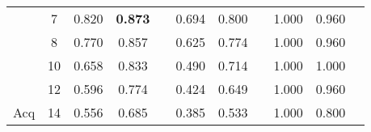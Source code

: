 \begin{table}[]
\begin{tabular}{|c|c|c|c|c|c|c|c|c|c|c|}
                       & 7                     & \cellcolor[HTML]{EFEFEF}0.820          & \cellcolor[HTML]{EFEFEF}\textbf{0.873} & \cellcolor[HTML]{EFEFEF}      & 0.694    & 0.800    &          & \cellcolor[HTML]{EFEFEF}1.000 & \cellcolor[HTML]{EFEFEF}0.960 & \cellcolor[HTML]{EFEFEF}      \\ \cline{2-11} 
                       & 8                     & \cellcolor[HTML]{EFEFEF}0.770          & \cellcolor[HTML]{EFEFEF}0.857          & \cellcolor[HTML]{EFEFEF}      & 0.625    & 0.774    &          & \cellcolor[HTML]{EFEFEF}1.000 & \cellcolor[HTML]{EFEFEF}0.960 & \cellcolor[HTML]{EFEFEF}      \\ \cline{2-11} 
                       & 10                    & \cellcolor[HTML]{EFEFEF}0.658          & \cellcolor[HTML]{EFEFEF}0.833          & \cellcolor[HTML]{EFEFEF}      & 0.490    & 0.714    &          & \cellcolor[HTML]{EFEFEF}1.000 & \cellcolor[HTML]{EFEFEF}1.000 & \cellcolor[HTML]{EFEFEF}      \\ \cline{2-11} 
                       & 12                    & \cellcolor[HTML]{EFEFEF}0.596          & \cellcolor[HTML]{EFEFEF}0.774          & \cellcolor[HTML]{EFEFEF}      & 0.424    & 0.649    &          & \cellcolor[HTML]{EFEFEF}1.000 & \cellcolor[HTML]{EFEFEF}0.960 & \cellcolor[HTML]{EFEFEF}      \\ \cline{2-11} 
\multirow{-9}{*}{Acq}  & 14                    & \cellcolor[HTML]{EFEFEF}0.556          & \cellcolor[HTML]{EFEFEF}0.685          & \cellcolor[HTML]{EFEFEF}      & 0.385    & 0.533    &          & \cellcolor[HTML]{EFEFEF}1.000 & \cellcolor[HTML]{EFEFEF}0.800 & \cellcolor[HTML]{EFEFEF}      \\ \hline
\end{tabular}
\end{table}
